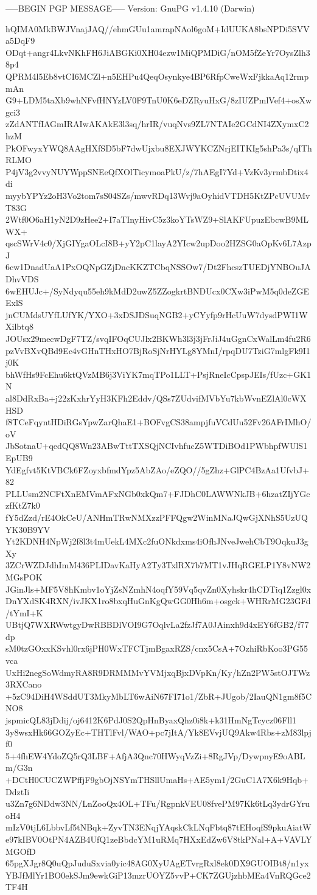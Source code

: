 -----BEGIN PGP MESSAGE-----
Version: GnuPG v1.4.10 (Darwin)

hQIMA0MkBWJVnajJAQ//ehmGUu1amrapNAol6goM+IdUUKA8bsNPDi5SVVa5DqF9
ODqt+angr4LkvNKhFH6JiABGKi0XH04ezw1MiQPMDiG/nOM5fZeYr7OysZlh38p4
QPRM4l5Eb8vtCI6MCZl+n5EHPu4QeqOsynkye4BP6RfpCweWxFjkkaAq12rmpmAn
G9+LDM5taXb9whNFvfHNYzLV0F9TnU0K6eDZRyuHxG/8zIUZPmlVef4+osXwgci3
zZdANTfIAGmIRAIwAKAkE3l3sq/hrIR/vuqNvs9ZL7NTAIe2GCdNI4ZXymxC2hzM
PkOFwyxYWQ8AAgHXfSD5bF7dwUjxbu8EXJWYKCZNrjEITKIg5shPa3s/qIThRLMO
P4jV3g2vvyNUYWppSNEeQfXOlTicymoaPkU/z/7hAEgI7Yd+VzKv3yrmbDtix4di
myybYPYz2oH3Vo2tom7sS04SZs/mwvRDq13Wvj9aOyhidVTDH5KtZPcUVUMvT83G
2Wtf0O6aH1yN2D9zHee2+I7aTInyHivC5z3koYTsWZ9+SlAKFUpuzEbcwB9MLWX+
qscSWrV4c0/XjGIYgaOLcI8B+yY2pC1layA2YIcw2upDoo2HZSG0aOpKv6L7AzpJ
6cw1DnadUaA1PxOQNpGZjDncKKZTCbqNSSOw7/Dt2FhcszTUEDjYNBOuJADhvVDS
6wEHUJc+/SyNdyqu55eh9kMdD2uwZ5ZZogkrtBNDUcx0CXw3iPwM5q0deZGEExlS
jnCUMdsUYfLUfYK/YXO+3xDSJDSuqNGB2+yCYyfp9rHcUuW7dysdPWI1WXilbtq8
JOUsx29mecwDgF7TZ/svqIFOqCUJlx2BKWh3l3j3jFrJiJ4uGgnCxWalLm4fu2R6
pzVvBXvQBd9Ec4vGHnTHxHO7BjRoSjNrHYLg8YMnI/rpqDU7TziG7mlgFk9I1j0K
bhWfHs9FcEhu6ktQVzMB6j3ViYK7mqTPo1LLT+PsjRneIcCpspJEIs/fUzc+GK1N
al8DdRxBa+j22zKxhrYyH3KFh2Eddv/QSs7ZUdvifMVbYu7kbWvnEZlAl0cWXHSD
f8TCeFqyntHDiRGsYpwZarQhaE1+BOFvgCS38ampjfuVCdUu52Fv26AFrIMhO/oV
JbSotnaU+qedQQ8Wn23ABwTttTXSQjNCIvhfucZ5WTDiBOd1PWbhpfWUlS1EpUB9
YdEgfvt5KtVBCk6FZoyxbfmdYpz5AbZAo/eZQO//5gZhz+GlPC4BzAa1UfvbJ+82
PLLUsm2NCFtXnEMVmAFxNGb0xkQm7+FJDhC0LAWWNkJB+6hzatZIjYGczfKtZ7k0
fY5dZzd/rE4OkCeU/ANHmTRwNMXzzPFFQgw2WinMNaJQwGjXNhS5UzUQYK30B9YV
Yt2KDNH4NpWj2f8l3t4mUekL4MXc2fuONkdxms4iOfhJNveJwehCbT9OqkuJ3gXy
3ZCrWZDJdhImM436PLIDavKaHyA2Ty3TxlRX7b7MT1vJHqRGELP1Y8vNW2MGsPOK
JGinJls+MF5V8hKmbv1oYjZsNZmhN4oqfY59Vq5qvZn0Xyhskr4hCDTiq1Zzgl0x
DnYXdSK4RXN/ivJKX1ro8bxqHuGnKgQwGG0Hh6m+osgck+WHRrMG23GFd/tYmI+K
UBtjQ7WXRWwtgyDwRBBDlVOI9G7OqlvLa2fzJf7A0JAinxh9d4xEY6fGB2/f77dp
sM0tzGOxxKSvhl0rx6jPH0WxTFCTjmBgaxRZS/cnx5CsA+7OzhiRbKoo3PG55vca
UxHi2negSoWdmyRA8R9DRMMMvYVMjxqBjxDVpKn/Ky/hZn2PW5stOJTWz3RXCano
+5zC94DiH4WSddUT3MkyMbLT6wAiN67FI71o1/ZbR+JUgob/2IauQN1gm8f5CNO8
jspmicQL83jDdij/oj6412K6PdJ0S2QpHnByaxQhz0i8k+k31HmNgTcycz06Fll1
3y8wsxHk66GOZyEc+THTlFvl/WAO+pc7jItA/Yk8EVvjUQ9Akw4Rbs+zM83lpjf0
5+4fhEW4YdoZQ5rQ3LBF+AfjA3Qnc70HWyqVzZi+8RgJVp/DywpnyE9oABLm/G3n
+DCtH0CUCZWPffjF9gbOjNSYmTHSllUmaHs+AE5ym1/2GuC1A7X6k9Hqb+DdztIi
u3Zn7g6NDdw3NN/LnZooQx4OL+TFu/RgpnkVEU08fvePM97Kk6tLq3ydrGYruoH4
mIzV0tjL6LbbvLf5tNBqk+ZyvTN3ENqjYAqskCkLNqFbtq87tEHoqfS9pkuAiatW
e97kIBV0OtPN4AZB4UfQ1zeBbdcYM1uRMq7HXxEdZw6V8tkPNal+A+VAVLYMGOfD
65pgXJgr8Q0uQpJuduSxvia0yic48AG0XyUAgETvrgRxl8ek0DX9GUOIBt8/n1yx
YBJfMlYr1BO0ekSJm9ewkGiP13mzrUOYZ5vvP+CK7ZGUjzhbMEa4VnRQGce2TF4H
